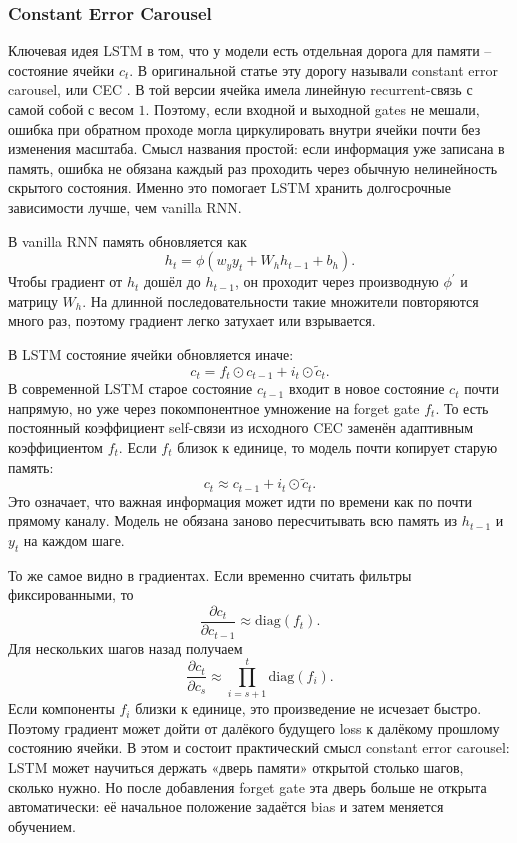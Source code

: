 \documentclass[12pt,fleqn]{article}
\begin{document}
\subsubsection{Constant Error Carousel}

Ключевая идея LSTM в том, что у модели есть отдельная дорога для памяти -- состояние ячейки $c_t$.
В оригинальной статье эту дорогу называли constant error carousel, или CEC \cite{hochreiter1997}.
В той версии ячейка имела линейную recurrent-связь с самой собой с весом $1$.
Поэтому, если входной и выходной gates не мешали, ошибка при обратном проходе могла циркулировать внутри ячейки почти без изменения масштаба.
Смысл названия простой: если информация уже записана в память, ошибка не обязана каждый раз проходить через обычную нелинейность скрытого состояния.
Именно это помогает LSTM хранить долгосрочные зависимости лучше, чем vanilla RNN.

В vanilla RNN память обновляется как
\begin{equation}
  h_t = \phi(w_y y_t + W_h h_{t-1} + b_h).
\end{equation}
Чтобы градиент от $h_t$ дошёл до $h_{t-1}$, он проходит через производную $\phi^\prime$ и матрицу $W_h$.
На длинной последовательности такие множители повторяются много раз, поэтому градиент легко затухает или взрывается.

В LSTM состояние ячейки обновляется иначе:
\begin{equation}
  c_t = f_t \odot c_{t-1} + i_t \odot \widetilde{c}_t.
\end{equation}
В современной LSTM старое состояние $c_{t-1}$ входит в новое состояние $c_t$ почти напрямую, но уже через покомпонентное умножение на forget gate $f_t$.
То есть постоянный коэффициент self-связи из исходного CEC заменён адаптивным коэффициентом $f_t$.
Если $f_t$ близок к единице, то модель почти копирует старую память:
\begin{equation}
  c_t \approx c_{t-1} + i_t \odot \widetilde{c}_t.
\end{equation}
Это означает, что важная информация может идти по времени как по почти прямому каналу.
Модель не обязана заново пересчитывать всю память из $h_{t-1}$ и $y_t$ на каждом шаге.

То же самое видно в градиентах.
Если временно считать фильтры фиксированными, то
\begin{equation}
  \frac{\partial c_t}{\partial c_{t-1}}
  \approx
  \mathrm{diag}(f_t).
\end{equation}
Для нескольких шагов назад получаем
\begin{equation}
  \frac{\partial c_t}{\partial c_s}
  \approx
  \prod_{i=s+1}^{t}
  \mathrm{diag}(f_i).
\end{equation}
Если компоненты $f_i$ близки к единице, это произведение не исчезает быстро.
Поэтому градиент может дойти от далёкого будущего loss к далёкому прошлому состоянию ячейки.
В этом и состоит практический смысл constant error carousel: LSTM может научиться держать «дверь памяти» открытой столько шагов, сколько нужно.
Но после добавления forget gate эта дверь больше не открыта автоматически: её начальное положение задаётся bias и затем меняется обучением.
\end{document}
